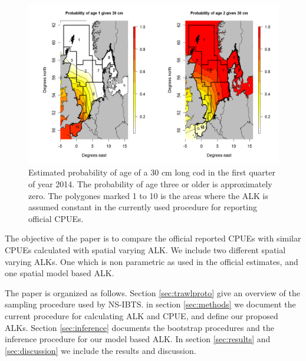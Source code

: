 \documentclass[a4paper 12pt]{article}
\numberwithin{equation}{section}
\begin{document}
\begin{figure}
\includegraphics[scale=0.4]{30cm2014.png}
\caption{Estimated probability of age of a 30 cm long cod in the first quarter of year 2014. The probability of age three or older is approximately zero. The polygones marked 1 to 10 is the areas where the ALK is assumed constant in the currently used procedure for reporting official CPUEs.}\label{fig:30cmCod2014}
\end{figure}

The objective of the paper is to compare the official reported CPUEs with similar CPUEs calculated with spatial varying ALK. We include two different spatial varying ALKs. One which is non parametric as used in the official estimates, and one spatial model based ALK.

The paper is organized as follows. Section \ref{sec:trawlproto} give an overview of the sampling procedure used by NS-IBTS. in section \ref{sec:methods} we document the current procedure for calculating ALK and CPUE, and define our proposed ALKs. Section \ref{sec:inference} documents the bootstrap procedures and the inference procedure for our model based ALK. In section \ref{sec:results} and \ref{sec:discussion} we include the results and discussion.

\end{document}

